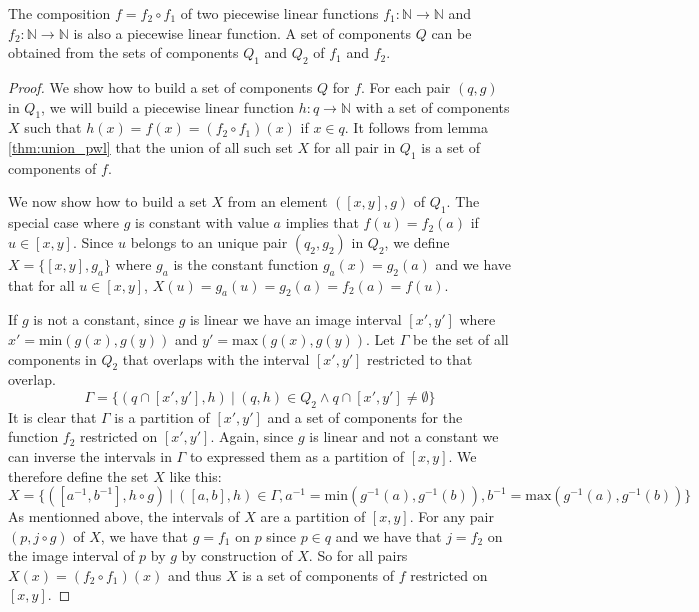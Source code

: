 \begin{lemma}
  The composition $f = f_2 \circ f_1 $ of two piecewise linear functions $f_1 :
  \mathbb{N} \rightarrow \mathbb{N}$ and $f_2 : \mathbb{N} \rightarrow
  \mathbb{N}$ is also a piecewise linear function. A set of components $Q$ can
  be obtained from the sets of components $Q_1$ and $Q_2$ of $f_1$ and $f_2$.
\end{lemma}
\begin{proof}
  We show how to build a set of components $Q$ for $f$. For each pair $(q, g)$
  in $Q_1$, we will build a piecewise linear function $h : q \rightarrow
  \mathbb{N}$ with a set of components $X$ such that $h(x) = f(x) = (f_2 \circ
  f_1)(x)$ if $x \in q$. It follows from lemma \ref{thm:union_pwl} that the
  union of all such set $X$ for all pair in $Q_1$ is a set of components of $f$.
  
  We now show how to build a set $X$ from an element $([x,y], g)$ of $Q_1$.
  The special case where $g$ is constant with value $a$ implies that $f(u) =
  f_2(a)$ if $u \in [x,y]$. Since $u$ belongs to an unique pair $(q_2, g_2)$ in
  $Q_2$, we define $X = \{[x,y], g_a\}$ where $g_a$ is the constant function
  $g_a(x) = g_2(a)$ and we have that for all $u \in [x,y]$, $X(u) = g_a(u) =
  g_2(a) = f_2(a) = f(u)$.

  If $g$ is not a constant, since $g$ is linear we have an image interval $[x',
  y']$ where $x' = \text{min}(g(x),g(y))$ and $y' = \text{max}(g(x),g(y))$. Let
  $\Gamma$ be the set of all components in $Q_2$ that overlaps with the interval
  $[x',y']$ restricted to that overlap.
  \begin{equation*}
    \Gamma = \{(q \cap [x',y'], h) \ | \ (q, h) \in Q_2 \land q \cap [x',y'] \neq \emptyset \}
  \end{equation*}
  It is clear that $\Gamma$ is a partition of $[x',y']$ and a set of components
  for the function $f_2$ restricted on $[x',y']$. Again, since $g$ is linear and
  not a constant we can inverse the intervals in $\Gamma$ to expressed them as a
  partition of $[x,y]$. We therefore define the set $X$ like this:
  \begin{equation*}
    X = \{([a^{-1}, b^{-1}], h \circ g) \ | \ 
    ([a,b], h) \in \Gamma, 
    a^{-1} = \text{min}(g^{-1}(a), g^{-1}(b)), 
    b^{-1} = \text{max}(g^{-1}(a), g^{-1}(b)) \}
  \end{equation*}
  As mentionned above, the intervals of $X$ are a partition of $[x,y]$. For any
  pair $(p, j \circ g)$ of $X$, we have that $g = f_1$ on $p$ since
  $p \in q$ and we have that $j = f_2$ on the image interval of $p$ by
  $g$ by construction of $X$. So for all pairs $X(x) = (f_2 \circ f_1)(x)$ and
  thus $X$ is a set of components of $f$ restricted on $[x,y]$.

\end{proof}

